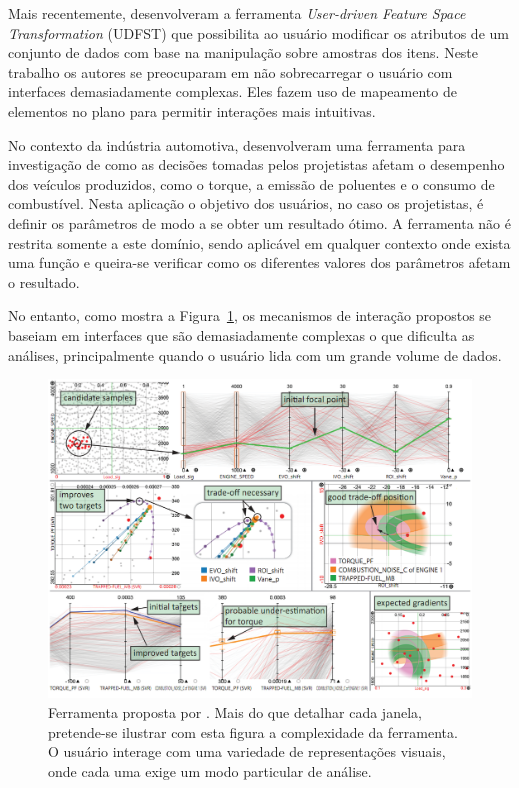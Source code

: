 
Mais recentemente, \cite{Gladys2013} desenvolveram a
ferramenta \emph{User-driven Feature Space Transformation}
(UDFST) que possibilita ao usuário modificar os
atributos de um conjunto de dados com base na manipulação
sobre amostras dos itens. Neste trabalho os autores se
preocuparam em não sobrecarregar o usuário com interfaces  
demasiadamente complexas. Eles fazem uso de mapeamento de
elementos no plano para permitir interações mais intuitivas.



No contexto da indústria automotiva, \cite{Berger2011}
desenvolveram uma ferramenta para investigação de como as
decisões tomadas pelos projetistas afetam o desempenho dos
veículos produzidos, como o torque, a emissão de poluentes e
o consumo de combustível. Nesta aplicação o objetivo dos
usuários, no caso os projetistas, é definir os parâmetros de
modo a se obter um resultado ótimo. A ferramenta não é
restrita somente a este domínio, sendo aplicável em
qualquer contexto onde exista uma função e queira-se
verificar como os diferentes valores dos parâmetros 
afetam o resultado.

No entanto, como mostra a Figura~\ref{fig:berger}, os
mecanismos de interação propostos se baseiam em interfaces
que são demasiadamente complexas o que dificulta as
análises, principalmente quando o usuário lida com um grande
volume de dados.

\begin{figure}[h!]
    \centering
    \includegraphics[width=16cm]{images/berger.png}
    \caption[Ferramenta proposta por \cite{Berger2011}]
    {Ferramenta proposta por \cite{Berger2011}. Mais do que detalhar cada janela, pretende-se ilustrar com
esta figura a complexidade da ferramenta. O usuário interage
com uma variedade de representações visuais, onde cada uma exige
um modo particular de análise.}
    \label{fig:berger}
\end{figure}

